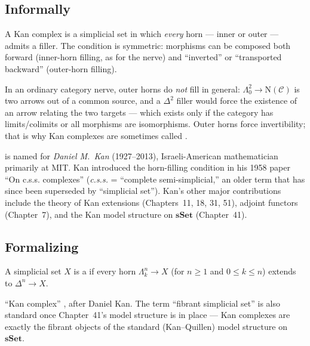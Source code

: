 \subsection{Informally}

A Kan complex is a simplicial set in which \emph{every} horn — inner or
outer — admits a filler. The condition is symmetric: morphisms can be
composed both forward (inner-horn filling, as for the nerve) and
``inverted'' or ``transported backward'' (outer-horn filling).

In an ordinary category nerve, outer horns do \emph{not} fill in general:
$\Lambda^2_0 \to \mathrm{N}(\mathcal{C})$ is two arrows out of a common
source, and a $\Delta^2$ filler would force the existence of an arrow
relating the two targets — which exists only if the category has
limits/colimits or all morphisms are isomorphisms. Outer horns force
invertibility; that is why Kan complexes are sometimes called
.

\begin{nameorigin}
 is named for \emph{Daniel M.\ Kan} (1927--2013),
Israeli-American mathematician primarily at MIT. Kan introduced the
horn-filling condition in his 1958 paper ``On c.s.s. complexes'' (\emph{c.s.s.}
= ``complete semi-simplicial,'' an older term that has since been
superseded by ``simplicial set''). Kan's other major contributions
include the theory of Kan extensions (Chapters~11, 18, 31, 51), adjoint
functors (Chapter~7), and the Kan model structure on $\mathbf{sSet}$
(Chapter~41).
\end{nameorigin}

\subsection{Formalizing}

\begin{definition}
\label{def:kan-complex}
A simplicial set $X$ is a  if every horn $\Lambda^n_k
\to X$ (for $n \geq 1$ and $0 \leq k \leq n$) extends to $\Delta^n \to X$.
\end{definition}

\begin{howtosay}
``Kan complex'' , after
Daniel Kan. The term ``fibrant simplicial set'' is also standard once
Chapter~41's model structure is in place — Kan complexes are exactly
the fibrant objects of the standard (Kan–Quillen) model structure on
$\mathbf{sSet}$.
\end{howtosay}

